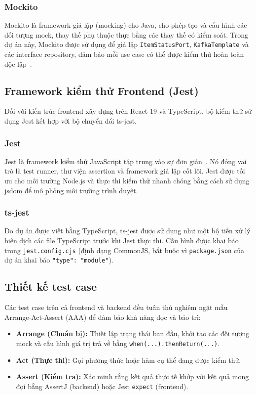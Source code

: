 \subsubsection{Mockito}
Mockito là framework giả lập (mocking) cho Java, cho phép tạo và cấu hình các đối
tượng mock, thay thế phụ thuộc thực bằng các thay thế có kiểm soát. Trong dự án
này, Mockito được sử dụng để giả lập \texttt{ItemStatusPort}, \texttt{KafkaTemplate}
và các interface repository, đảm bảo mỗi use case có thể được kiểm thử hoàn toàn
độc lập~\cite{mockito}.

\subsection{Framework kiểm thử Frontend (Jest)}

Đối với kiến trúc frontend xây dựng trên React 19 và TypeScript, bộ kiểm thử sử
dụng Jest kết hợp với bộ chuyển đổi ts-jest.

\subsubsection{Jest}
Jest là framework kiểm thử JavaScript tập trung vào sự đơn giản~\cite{jest}. Nó
đóng vai trò là test runner, thư viện assertion và framework giả lập cốt lõi. Jest
được tối ưu cho môi trường Node.js và thực thi kiểm thử nhanh chóng bằng cách sử
dụng jsdom để mô phỏng môi trường trình duyệt.

\subsubsection{ts-jest}
Do dự án được viết bằng TypeScript, ts-jest được sử dụng như một bộ tiền xử lý biên
dịch các file TypeScript trước khi Jest thực thi. Cấu hình được khai báo trong
\texttt{jest.config.cjs} (định dạng CommonJS, bắt buộc vì \texttt{package.json}
của dự án khai báo \texttt{"type": "module"}).

\subsection{Thiết kế test case}

Các test case trên cả frontend và backend đều tuân thủ nghiêm ngặt mẫu
Arrange-Act-Assert (AAA) để đảm bảo khả năng đọc và bảo trì:

\begin{itemize}
    \item \textbf{Arrange (Chuẩn bị):} Thiết lập trạng thái ban đầu, khởi tạo các
          đối tượng mock và cấu hình giá trị trả về bằng
          \texttt{when(...).thenReturn(...)}.
    \item \textbf{Act (Thực thi):} Gọi phương thức hoặc hàm cụ thể đang được kiểm
          thử.
    \item \textbf{Assert (Kiểm tra):} Xác minh rằng kết quả thực tế khớp với kết
          quả mong đợi bằng AssertJ (backend) hoặc Jest \texttt{expect} (frontend).
\end{itemize}

